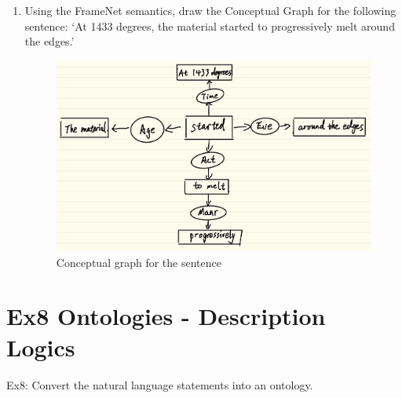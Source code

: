 \documentclass[12pt]{article}
\begin{document}
{\begin{enumerate}[1.]
	VerbNet and PropBank are similar and tightly connected, they are made by generalized semantic roles, 
	but FrameNet has more thematic roles than VerbNet and PropBank, e.g. Cause.
	\item Using the FrameNet semantics, draw the Conceptual Graph for the following sentence:  
	‘At 1433 degrees, the material started to progressively melt around the edges.’
	\begin{figure}[ht]
		\centering
		\includegraphics[scale=0.18]{figs/conceptual_graph.jpg}
		\caption{Conceptual graph for the sentence}
		\label{fig:label8}
	\end{figure}
\end{enumerate}

\newpage
\section{Ex8 Ontologies - Description Logics}
\label{sec: ex8}
Ex8: Convert the natural language statements into an ontology.

}
\end{document}
